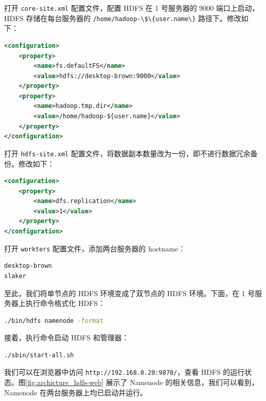 \documentclass{ctexart}
\newcommand{\code}[1]{\colorbox{backcolor}{\lstinline|#1|}}
\begin{document}
    打开 \code{core-site.xml} 配置文件，配置 HDFS 在 1 号服务器的 9000 端口上启动，HDFS 存储在每台服务器的 \code{/home/hadoop-\$\{user.name\}} 路径下。修改如下：

    \begin{lstlisting}[language=XML]
<configuration>
    <property>
        <name>fs.defaultFS</name>
        <value>hdfs://desktop-brown:9000</value>
    </property>
    <property>
        <name>hadoop.tmp.dir</name>
        <value>/home/hadoop-${user.name}</value>
    </property>
</configuration>
    \end{lstlisting}

    打开 \code{hdfs-site.xml} 配置文件，将数据副本数量改为一份，即不进行数据冗余备份。修改如下：

    \begin{lstlisting}[language=XML]
<configuration>
    <property>
        <name>dfs.replication</name>
        <value>1</value>
    </property>
</configuration>
    \end{lstlisting}

    打开 \code{workters} 配置文件，添加两台服务器的 hostname：

    \begin{lstlisting}[language=bash]
desktop-brown
slaker
    \end{lstlisting}

    至此，我们将单节点的 HDFS 环境变成了双节点的 HDFS 环境。下面，在 1 号服务器上执行命令格式化 HDFS：

    \begin{lstlisting}[language=bash]
./bin/hdfs namenode -format
    \end{lstlisting}

    接着，执行命令启动 HDFS 和管理器：

    \begin{lstlisting}[language=bash]
./sbin/start-all.sh
    \end{lstlisting}

    我们可以在浏览器中访问 \code{http://192.168.0.20:9870/}，查看 HDFS 的运行状态。图\ref{fig:archicture_hdfs-web} 展示了 Namenode 的相关信息，我们可以看到，Namenode 在两台服务器上均已启动并运行。
\end{document}
